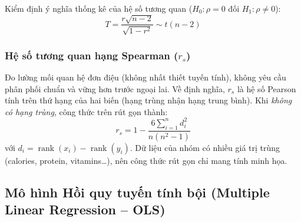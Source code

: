 \documentclass[12pt,a4paper]{article}
\begin{document}
Kiểm định ý nghĩa thống kê của hệ số tương quan ($H_0: \rho = 0$ đối $H_1: \rho \ne 0$):
\begin{equation}
  T = \frac{r\sqrt{n-2}}{\sqrt{1-r^2}} \sim t(n-2)
\end{equation}

\subsubsection{Hệ số tương quan hạng Spearman ($r_s$)}

Đo lường mối quan hệ đơn điệu (không nhất thiết tuyến tính), không yêu cầu phân phối chuẩn và
vững hơn trước ngoại lai. Về định nghĩa, $r_s$ là hệ số Pearson tính trên thứ hạng của hai
biến (hạng trùng nhận hạng trung bình). Khi \emph{không có hạng trùng},
công thức trên rút gọn thành:
\begin{equation}
  r_s = 1 - \frac{6\sum_{i=1}^{n} d_i^2}{n(n^2-1)}
\end{equation}
với $d_i = \operatorname{rank}(x_i) - \operatorname{rank}(y_i)$. Dữ liệu của nhóm có nhiều giá
trị trùng (calories, protein, vitamins\ldots), nên công thức rút gọn chỉ mang tính minh họa.

\subsection{Mô hình Hồi quy tuyến tính bội (Multiple Linear Regression -- OLS)}
\label{sec:ols}
\end{document}
